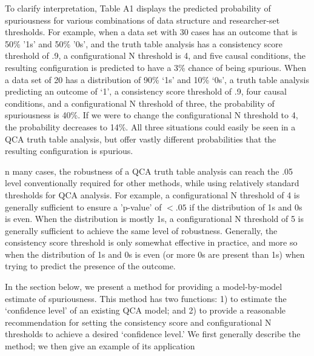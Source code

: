 \documentclass[12pt]{article}
\begin{document}
{To clarify interpretation, Table A1 displays the predicted probability of spuriousness for various combinations of data structure and researcher-set thresholds. For example, when a data set with 30 cases has an outcome that is 50\% '1s' and 50\% '0s', and the truth table analysis has a consistency score threshold of .9, a configurational N threshold is 4, and five causal conditions, the resulting configuration is predicted to have a 3\% chance of being spurious. When a data set of 20 has a distribution of 90\% `1s' and 10\% `0s', a truth table analysis predicting an outcome of `1', a consistency score threshold of .9, four causal conditions, and a configurational N threshold of three, the probability of spuriousness is 40\%. If we were to change the configurational N threshold to 4, the probability decreases to 14\%. All three situations could easily be seen in a QCA truth table analysis, but offer vastly different probabilities that the resulting configuration is spurious.

n many cases, the robustness of a QCA truth table analysis can reach the .05 level conventionally required for other methods, while using relatively standard thresholds for QCA analysis. For example, a configurational N threshold of 4 is generally sufficient to ensure a 'p-value' of $<.05$ if the distribution of 1s and 0s is even. When the distribution is mostly 1s, a configurational N threshold of 5 is generally sufficient to achieve the same level of robustness. Generally, the consistency score threshold is only somewhat effective in practice, and more so when the distribution of 1s and 0s is even (or more 0s are present than 1s) when trying to predict the presence of the outcome.


In the section below, we present a method for providing a model-by-model estimate of spuriousness. This method has two functions: 1) to estimate the `confidence level' of an existing QCA model; and 2) to provide a reasonable recommendation for setting the consistency score and configurational N thresholds to achieve a desired `confidence level.' We first generally describe the method; we then give an example of its application 


}
\end{document}
